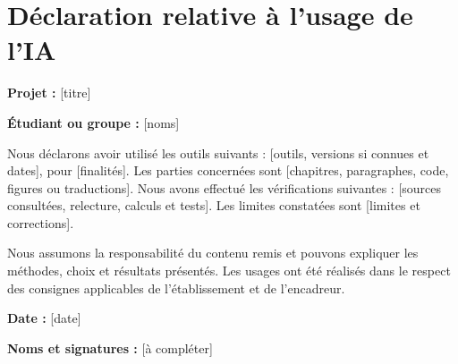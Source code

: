 \chapter{Déclaration relative à l'usage de l'IA}

\noindent\textbf{Projet :} [titre]

\noindent\textbf{Étudiant ou groupe :} [noms]

\medskip
\noindent Nous déclarons avoir utilisé les outils suivants : [outils, versions si connues et dates],
pour [finalités]. Les parties concernées sont [chapitres, paragraphes, code, figures ou traductions].
Nous avons effectué les vérifications suivantes : [sources consultées, relecture, calculs et tests].
Les limites constatées sont [limites et corrections].

\medskip
\noindent Nous assumons la responsabilité du contenu remis et pouvons expliquer les méthodes, choix et
résultats présentés. Les usages ont été réalisés dans le respect des consignes applicables de
l'établissement et de l'encadreur.


\medskip
\noindent\textbf{Date :} [date]

\noindent\textbf{Noms et signatures :} [à compléter]
